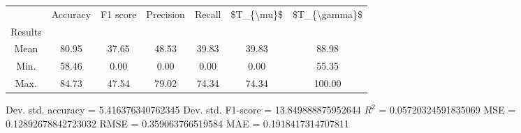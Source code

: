 \begin{tabular}{|c|c|c|c|c|c|c|}
\toprule
{} &  Accuracy &  F1 score &  Precision &  Recall &  \$T\_\{\textbackslash mu\}\$ &  \$T\_\{\textbackslash gamma\}\$ \\
Results &           &           &            &         &            &               \\
\hline
Mean    &     80.95 &     37.65 &      48.53 &   39.83 &      39.83 &         88.98 \\
Min.    &     58.46 &      0.00 &       0.00 &    0.00 &       0.00 &         55.35 \\
Max.    &     84.73 &     47.54 &      79.02 &   74.34 &      74.34 &        100.00 \\
\bottomrule
\end{tabular}

 Dev. std. accuracy = 5.416376340762345
 Dev. std. F1-score = 13.849888875952644
 $R^2$ = 0.05720324591835069
 MSE = 0.12892678842723032
 RMSE = 0.359063766519584
 MAE = 0.1918417314707811